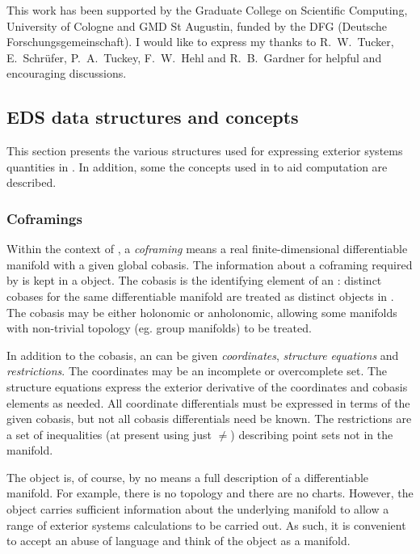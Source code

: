 This work has been supported by the Graduate College on Scientific
Computing, University of Cologne and GMD St Augustin, funded by the DFG (Deutsche
Forschungsgemeinschaft). I would like to express my thanks to R.~W.~Tucker,
E.~Schr{\"u}fer, P.~A.~Tuckey, F.~W.~Hehl and R.~B.~Gardner for helpful and
encouraging discussions.




\subsection{EDS data structures and concepts}
\label{EDS data structures and concepts}

This section presents the various structures used for expressing exterior
systems quantities in . In addition, some the concepts used in  to
aid computation are described.

\subsubsection{Coframings}
\label{Coframings}

Within the context of , a \emph{coframing} means a real
finite-dimensional differentiable manifold with a given global cobasis.
The information about a coframing required by  is kept in a
 object. The cobasis is the identifying element of an
 : distinct cobases for the same differentiable
manifold are treated as distinct  objects in . The
cobasis may be either holonomic or anholonomic, allowing some manifolds
with non-trivial topology (eg.  group manifolds) to be treated.

In addition to the cobasis, an   can be given
\emph{coordinates}, \emph{structure equations} and \emph{restrictions}. The
coordinates may be an incomplete or overcomplete set. The structure
equations express the exterior derivative of the coordinates and cobasis
elements as needed.  All coordinate differentials must be expressed in
terms of the given cobasis, but not all cobasis differentials need be
known. The restrictions are a set of inequalities (at present using just
$\neq$) describing point sets not in the manifold.

The  object is, of course, by no means a full
description of a differentiable manifold. For example, there is no
topology and there are no charts. However, the  object
carries sufficient information about the underlying manifold to allow a
range of exterior systems calculations to be carried out. As such, it is
convenient to accept an abuse of language and think of the
 object as a manifold.

